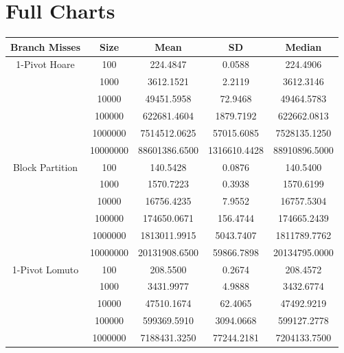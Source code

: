 \documentclass{article}
\begin{document}
\section{Full Charts}
\begin{center}
    \small
    \begin{tabular}{ |c c | c c c| }
        \hline
        Branch Misses   & Size     & Mean           & SD            & Median \\
        \hline
        1-Pivot Hoare   & 100      & 224.4847       & 0.0588        & 224.4906 \\
                        & 1000     & 3612.1521      & 2.2119        & 3612.3146 \\
                        & 10000    & 49451.5958     & 72.9468       & 49464.5783 \\
                        & 100000   & 622681.4604    & 1879.7192     & 622662.0813 \\
                        & 1000000  & 7514512.0625   & 57015.6085    & 7528135.1250 \\
                        & 10000000 & 88601386.6500  & 1316610.4428  & 88910896.5000 \\
        Block Partition & 100      & 140.5428       & 0.0876        & 140.5400 \\
                        & 1000     & 1570.7223      & 0.3938        & 1570.6199 \\
                        & 10000    & 16756.4235     & 7.9552        & 16757.5304 \\
                        & 100000   & 174650.0671    & 156.4744      & 174665.2439 \\
                        & 1000000  & 1813011.9915   & 5043.7407     & 1811789.7762 \\
                        & 10000000 & 20131908.6500  & 59866.7898    & 20134795.0000 \\
        \hline
        1-Pivot Lomuto  & 100      & 208.5500       & 0.2674        & 208.4572 \\
                        & 1000     & 3431.9977      & 4.9888        & 3432.6774 \\
                        & 10000    & 47510.1674     & 62.4065       & 47492.9219 \\
                        & 100000   & 599369.5910    & 3094.0668     & 599127.2778 \\
                        & 1000000  & 7188431.3250   & 77244.2181    & 7204133.7500 \\

\end{tabular}
\end{center}
\end{document}
